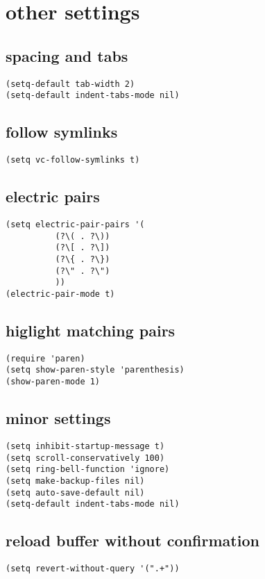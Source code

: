 \documentclass[11pt]{article}
\begin{document}
\section{other settings}
\label{sec:org5c1d795}
\subsection{spacing and tabs}
\label{sec:org51d23b6}
\begin{verbatim}
(setq-default tab-width 2)
(setq-default indent-tabs-mode nil)
\end{verbatim}
\subsection{follow symlinks}
\label{sec:org91d2a6b}
\begin{verbatim}
(setq vc-follow-symlinks t)
\end{verbatim}
\subsection{electric pairs}
\label{sec:org018317f}
\begin{verbatim}
(setq electric-pair-pairs '(
          (?\( . ?\))
          (?\[ . ?\])
          (?\{ . ?\})
          (?\" . ?\")
          ))
(electric-pair-mode t)
\end{verbatim}
\subsection{higlight matching pairs}
\label{sec:orge5af42e}
\begin{verbatim}
(require 'paren)
(setq show-paren-style 'parenthesis)
(show-paren-mode 1)
\end{verbatim}
\subsection{minor settings}
\label{sec:org89f0d87}
\begin{verbatim}
(setq inhibit-startup-message t)
(setq scroll-conservatively 100)
(setq ring-bell-function 'ignore)
(setq make-backup-files nil)
(setq auto-save-default nil)
(setq-default indent-tabs-mode nil)
\end{verbatim}
\subsection{reload buffer without confirmation}
\label{sec:org5711c5c}
\begin{verbatim}
(setq revert-without-query '(".+"))
\end{verbatim}
\end{document}
